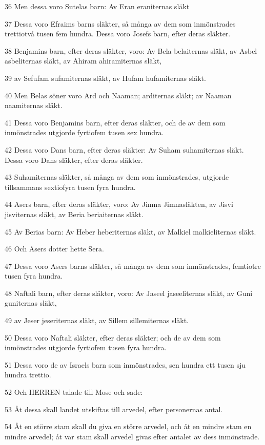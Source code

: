 \par 36 Men dessa voro Sutelas barn: Av Eran eraniternas släkt
\par 37 Dessa voro Efraims barns släkter, så många av dem som inmönstrades trettiotvå tusen fem hundra. Dessa voro Josefs barn, efter deras släkter.
\par 38 Benjamins barn, efter deras släkter, voro: Av Bela belaiternas släkt, av Asbel asbeliternas släkt, av Ahiram ahiramiternas släkt,
\par 39 av Sefufam sufamiternas släkt, av Hufam hufamiternas släkt.
\par 40 Men Belas söner voro Ard och Naaman; arditernas släkt; av Naaman naamiternas släkt.
\par 41 Dessa voro Benjamins barn, efter deras släkter, och de av dem som inmönstrades utgjorde fyrtiofem tusen sex hundra.
\par 42 Dessa voro Dans barn, efter deras släkter: Av Suham suhamiternas släkt. Dessa voro Dans släkter, efter deras släkter.
\par 43 Suhamiternas släkter, så många av dem som inmönstrades, utgjorde tillsammans sextiofyra tusen fyra hundra.
\par 44 Asers barn, efter deras släkter, voro: Av Jimna Jimnasläkten, av Jisvi jisviternas släkt, av Beria beriaiternas släkt.
\par 45 Av Berias barn: Av Heber heberiternas släkt, av Malkiel malkieliternas släkt.
\par 46 Och Asers dotter hette Sera.
\par 47 Dessa voro Asers barns släkter, så många av dem som inmönstrades, femtiotre tusen fyra hundra.
\par 48 Naftali barn, efter deras släkter, voro: Av Jaseel jaseeliternas släkt, av Guni guniternas släkt,
\par 49 av Jeser jeseriternas släkt, av Sillem sillemiternas släkt.
\par 50 Dessa voro Naftali släkter, efter deras släkter; och de av dem som inmönstrades utgjorde fyrtiofem tusen fyra hundra.
\par 51 Dessa voro de av Israels barn som inmönstrades, sen hundra ett tusen sju hundra trettio.
\par 52 Och HERREN talade till Mose och sade:
\par 53 Åt dessa skall landet utskiftas till arvedel, efter personernas antal.
\par 54 Åt en större stam skall du giva en större arvedel, och åt en mindre stam en mindre arvedel; åt var stam skall arvedel givas efter antalet av dess inmönstrade.
